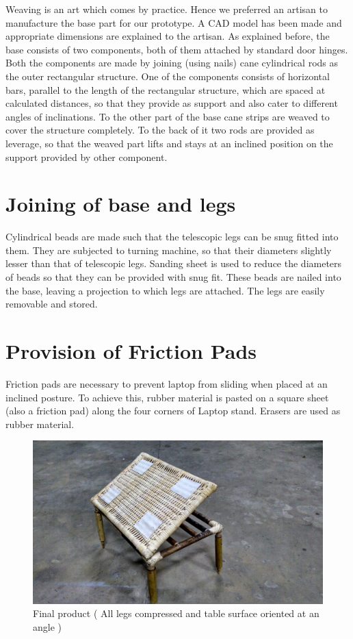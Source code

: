 Weaving is an art which comes by practice. Hence we preferred an artisan to manufacture the base part for our prototype. A CAD model has been made and appropriate dimensions are explained to the artisan. 
As explained before, the base consists of two components, both of them attached by standard door hinges. Both the components are made by joining (using nails) cane cylindrical rods as the outer rectangular structure. One of the components consists of  horizontal bars, parallel to the length of the rectangular structure, which are spaced at calculated distances, so that they provide as support and also cater to different angles of inclinations. To the other part of the base cane strips are weaved to cover the structure completely. To the back of it two rods are provided as leverage, so that the weaved part lifts and stays at an inclined position on the support provided by other component. 

\section{Joining of base and legs}

Cylindrical beads are made such that the telescopic legs can be snug fitted into them. They are subjected to turning machine, so that their diameters slightly lesser than that of telescopic legs. Sanding sheet is used to reduce the diameters of beads so that they can be provided with snug fit. These beads are nailed into the base, leaving a projection to which legs are attached. The legs are easily removable and stored. 

\section{Provision of Friction Pads}
Friction pads are necessary to prevent laptop from sliding when placed at an inclined posture. To achieve this, rubber material is pasted on a square sheet (also a friction pad) along the four corners of Laptop stand. Erasers are used as rubber material.

\begin{figure}[h]
    \centering
    \includegraphics[width=\linewidth]{fi1}
    \caption{Final product ( All legs compressed and table surface oriented at an angle )}
    \label{fig:mesh1}
\end{figure}

